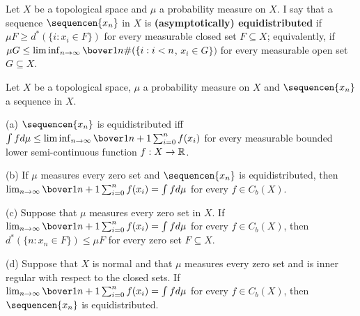 Let $X$ be a topological space and $\mu$ a probability measure on $X$.
I say that a sequence $\sequencen{x_n}$ in $X$
is {\bf (asymptotically) equidistributed}
if $\mu F\ge d^*(\{i:x_i\in F\})$ for every measurable closed set
$F\subseteq X$;   equivalently, if
$\mu G\le\liminf_{n\to\infty}\bover1n\#(\{i:i<n$, $x_i\in G\})$ for
every measurable open set $G\subseteq X$.


 Let $X$ be a topological space, $\mu$ a
probability measure on $X$ and $\sequencen{x_n}$ a sequence in $X$.

(a) $\sequencen{x_n}$ is equidistributed iff
$\int fd\mu\le\liminf_{n\to\infty}\bover1{n+1}\sum_{i=0}^nf(x_i)$
for every measurable bounded lower semi-continuous function
$f:X\to\Bbb
R$.

(b) If $\mu$ measures every zero set and $\sequencen{x_n}$ is
equidistributed, then
$\lim_{n\to\infty}\bover1{n+1}\sum_{i=0}^nf(x_i)=\int fd\mu$ for every
$f\in C_b(X)$.

(c) Suppose that $\mu$ measures every zero set in $X$.
If $\lim_{n\to\infty}\bover1{n+1}\sum_{i=0}^nf(x_i)=\int fd\mu$ for
every $f\in C_b(X)$, then $d^*(\{n:x_n\in F\})\le\mu F$ for every zero
set $F\subseteq X$.

(d) Suppose that $X$ is normal and that $\mu$ measures every zero set
and is inner regular with respect to the closed sets.
If $\lim_{n\to\infty}\bover1{n+1}\sum_{i=0}^nf(x_i)=\int fd\mu$ for
every $f\in C_b(X)$, then
$\sequencen{x_n}$ is equidistributed.


